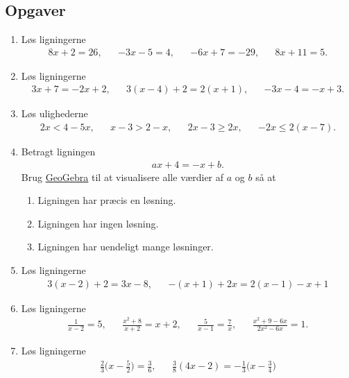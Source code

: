 \subsection{Opgaver}

\begin{enumerate}
\item Løs ligningerne
\begin{align*}
8x+2=26,&& -3x-5=4,&&-6x+7=-29,&& 8x+11=5.
\end{align*}

\item Løs ligningerne
\begin{align*}
3x+7=-2x+2,&& 3(x-4)+2=2(x+1),&& -3x-4=-x+3.
\end{align*}

\item Løs ulighederne 
\begin{align*}
2x<4-5x,&& x-3>2-x,&& 2x-3\geq 2x,&& -2x\leq2(x-7).
\end{align*}

\item Betragt ligningen
\begin{align*}
ax+4=-x+b.
\end{align*}
Brug \href{https://www.geogebra.org/m/Q4Wh3Xrj}{GeoGebra} til at visualisere alle værdier af $a$ og $b$ så at
\begin{enumerate}
\item Ligningen har præcis en løsning.
\item Ligningen har ingen løsning.
\item Ligningen har uendeligt mange løsninger.
\end{enumerate}

\item Løs ligningerne
\begin{align*}
 3(x-2)+2=3x-8,&& -(x+1)+2x=2(x-1)-x+1
\end{align*}

\item Løs ligningerne 
\begin{align*}
\frac{1}{x-2}=5,&& \frac{x^2+8}{x+2}=x+2,&& \frac{5}{x-1}=\frac{7}{x},&&  \frac{x^2+9-6x}{2x^2-6x}=1.
\end{align*}

\item Løs ligningerne
\begin{align*}
\frac{2}{3}\Big(x- \frac{5}{2}\Big)=\frac{3}{6},&& \frac{3}{8}(4x-2)=-\frac{1}{3}\Big(x-\frac{3}{4}\Big)
\end{align*}


\end{enumerate}
